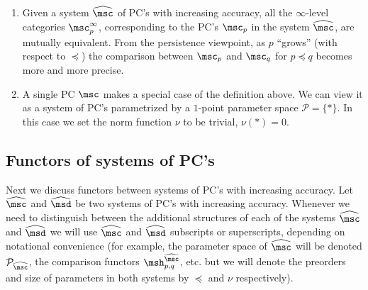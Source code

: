\begin{rem} \label{rem:pc-limits}
  \begin{enumerate}
  \item Given a system $\widehat{\msc}$ of PC's with increasing accuracy,
    all the $\infty$-level categories $\msc^{\infty}_p$, corresponding
    to the PC's $\msc_p$ in the system $\widehat{\msc}$, are mutually
    equivalent. From the persistence viewpoint, as $p$ ``grows'' (with
    respect to $\preceq$) the comparison between $\msc_p$ and
    $\msc_q$ for $p \preceq q$ becomes more and more
    precise. \label{i:rem-PC-1}
  \item A single PC $\msc$ makes a special case of the definition
    above. We can view it as a system of PC's parametrized by a
    $1$-point parameter space $\mathcal{P} = \{*\}$. In this case we
    set the norm function $\nu$ to be trivial, $\nu(*) =0$.
  \end{enumerate}
\end{rem}



\subsection{Functors of systems of PC's} \label{sbsb:func-sys-pc}
Next we discuss functors between systems of PC's with increasing
accuracy. Let $\widehat{\msc}$ and $\widehat{\msd}$ be two systems of
PC's with increasing accuracy. Whenever we need to distinguish between
the additional structures of each of the systems $\widehat{\msc}$ and
$\widehat{\msd}$ we will use $\widehat{\msc}$ and $\widehat{\msd}$
subscripts or superscripts, depending on notational convenience (for
example, the parameter space of $\widehat{\msc}$ will be denoted
$\mathcal{P}_{\widehat{\msc}}$, the comparison functors
$\msh_{p,q}^{\widehat{\msc}}$, etc. but we will denote the preorders
and size of parameters in both systems by $\preceq$ and $\nu$
respectively).

